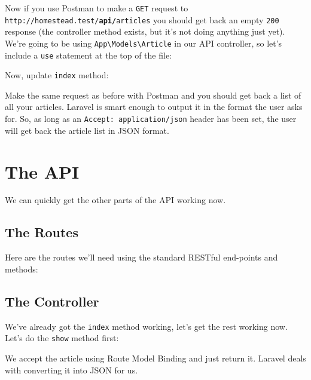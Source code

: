 Now if you use Postman to make a \texttt{GET} request to \texttt{http://homestead.test/\textbf{api/}articles} you should get back an empty \texttt{200} response (the controller method exists, but it's not doing anything just yet).
\\

We're going to be using \texttt{App\textbackslash{}Models\textbackslash{}Article} in our API controller, so let's include a \texttt{use} statement at the top of the file:


Now, update \texttt{index} method:



Make the same request as before with Postman and you should get back a list of all your articles. Laravel is smart enough to output it in the format the user asks for. So, as long as an \texttt{Accept: application/json} header has been set, the user will get back the article list in JSON format.


\section{The API}

We can quickly get the other parts of the API working now.

\subsection{The Routes}

Here are the routes we'll need using the standard RESTful end-points and methods:


\subsection{The Controller}

We've already got the \texttt{index} method working, let's get the rest working now.
\\

Let's do the \texttt{show} method first:


We accept the article using Route Model Binding and just return it. Laravel deals with converting it into JSON for us.
\\

